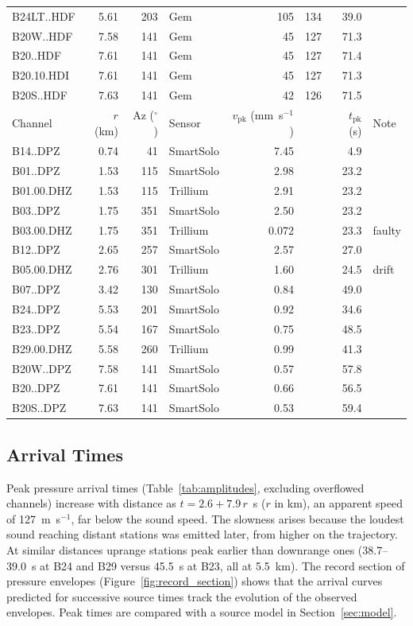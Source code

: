 \documentclass[]{seismica}
\begin{document}
\begin{table}[htbp]
\begin{tabular}{lrrlrrrl}
    B24LT..HDF & 5.61 & 203 & Gem & 105 & 134 & 39.0 &  \\
    B20W..HDF & 7.58 & 141 & Gem & 45 & 127 & 71.3 &  \\
    B20..HDF & 7.61 & 141 & Gem & 45 & 127 & 71.4 &  \\
    B20.10.HDI & 7.61 & 141 & Gem & 45 & 127 & 71.3 &  \\
    B20S..HDF & 7.63 & 141 & Gem & 42 & 126 & 71.5 &  \\
    \midrule
    Channel & $r$ (km) & Az ($^{\circ}$) & Sensor & $v_\text{pk}$ (mm~s$^{-1}$) & & $t_\text{pk}$ (s) & Note \\
    \midrule
    B14..DPZ & 0.74 & 41 & SmartSolo & 7.45 & & 4.9 &  \\
    B01..DPZ & 1.53 & 115 & SmartSolo & 2.98 & & 23.2 &  \\
    B01.00.DHZ & 1.53 & 115 & Trillium & 2.91 & & 23.2 &  \\
    B03..DPZ & 1.75 & 351 & SmartSolo & 2.50 & & 23.2 &  \\
    B03.00.DHZ & 1.75 & 351 & Trillium & 0.072 & & 23.3 & faulty \\
    B12..DPZ & 2.65 & 257 & SmartSolo & 2.57 & & 27.0 &  \\
    B05.00.DHZ & 2.76 & 301 & Trillium & 1.60 & & 24.5 & drift \\
    B07..DPZ & 3.42 & 130 & SmartSolo & 0.84 & & 49.0 &  \\
    B24..DPZ & 5.53 & 201 & SmartSolo & 0.92 & & 34.6 &  \\
    B23..DPZ & 5.54 & 167 & SmartSolo & 0.75 & & 48.5 &  \\
    B29.00.DHZ & 5.58 & 260 & Trillium & 0.99 & & 41.3 &  \\
    B20W..DPZ & 7.58 & 141 & SmartSolo & 0.57 & & 57.8 &  \\
    B20..DPZ & 7.61 & 141 & SmartSolo & 0.66 & & 56.5 &  \\
    B20S..DPZ & 7.63 & 141 & SmartSolo & 0.53 & & 59.4 &  \\
    \bottomrule
  \end{tabular}
\end{table}

\subsection{Arrival Times}
\label{sec:arrival_times}

Peak pressure arrival times (Table~\ref{tab:amplitudes}, excluding
overflowed channels) increase with distance as $t = 2.6 + 7.9\,r$~s
($r$ in km), an apparent speed of 127~m~s$^{-1}$, far below the sound
speed. The slowness arises because the loudest sound reaching distant stations was emitted later,
from higher on the trajectory. At similar distances uprange stations
peak earlier than downrange ones (38.7--39.0~s at B24 and B29 versus
45.5~s at B23, all at 5.5~km). The record
section of pressure envelopes (Figure~\ref{fig:record_section}) shows
that the arrival curves predicted for successive source times track the
evolution of the observed envelopes. Peak times are compared with a
source model in Section~\ref{sec:model}.
\end{document}
